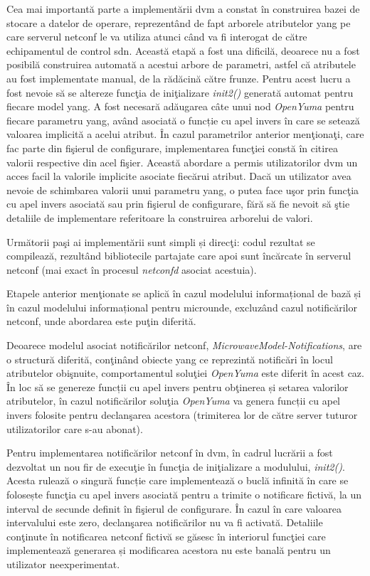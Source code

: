 Cea mai importantă parte a implementării \gls{dvm} a constat în construirea bazei de stocare a datelor de operare, reprezentând de fapt arborele atributelor \gls{yang} pe care serverul \gls{netconf} le va utiliza atunci când va fi interogat de către echipamentul de control \gls{sdn}. Această etapă a fost una dificilă, deoarece nu a fost posibilă construirea automată a acestui arbore de parametri, astfel că atributele au fost implementate manual, de la rădăcină către frunze. Pentru acest lucru a fost nevoie să se altereze funcţia de iniţializare \textit{init2()} generată automat pentru fiecare model \gls{yang}. A fost necesară adăugarea câte unui nod \textit{OpenYuma} pentru fiecare parametru \gls{yang}, având asociată o funcție cu apel invers în care se setează valoarea implicită a acelui atribut. În cazul parametrilor anterior menţionaţi, care fac parte din fişierul de configurare, implementarea funcţiei constă în citirea valorii respective din acel fişier. Această abordare a permis utilizatorilor \gls{dvm} un acces facil la valorile implicite asociate fiecărui atribut. Dacă un utilizator avea nevoie de schimbarea valorii unui parametru \gls{yang}, o putea face uşor prin funcţia cu apel invers asociată sau prin fişierul de configurare, fără să fie nevoit să ştie detaliile de implementare referitoare la construirea arborelui de valori.

Următorii paşi ai implementării sunt simpli și direcţi: codul rezultat se compilează, rezultând bibliotecile partajate care apoi sunt încărcate în serverul \gls{netconf} (mai exact în procesul \textit{netconfd} asociat acestuia).

Etapele anterior menţionate se aplică în cazul modelului informațional de bază și în cazul modelului informațional pentru microunde, excluzând cazul notificărilor \gls{netconf}, unde abordarea este puţin diferită.

Deoarece modelul asociat notificărilor \gls{netconf}, \textit{MicrowaveModel-Notifications}, are o structură diferită, conţinând obiecte \gls{yang} ce reprezintă notificări în locul atributelor obişnuite, comportamentul soluţiei \textit{OpenYuma} este diferit în acest caz. În loc să se genereze funcții cu apel invers pentru obţinerea și setarea valorilor atributelor, în cazul notificărilor soluţia \textit{OpenYuma} va genera funcții cu apel invers folosite pentru declanşarea acestora (trimiterea lor de către server tuturor utilizatorilor care s-au abonat).

Pentru implementarea notificărilor \gls{netconf} în \gls{dvm}, în cadrul lucrării a fost dezvoltat un nou fir de execuţie în funcţia de iniţializare a modulului, \textit{init2()}. Acesta rulează o singură funcție care implementează o buclă infinită în care se folosește funcţia cu apel invers asociată pentru a trimite o notificare fictivă, la un interval de secunde definit în fişierul de configurare. În cazul în care valoarea intervalului este zero, declanşarea notificărilor nu va fi activată. Detaliile conţinute în notificarea \gls{netconf} fictivă se găsesc în interiorul funcţiei care implementează generarea și modificarea acestora nu este banală pentru un utilizator neexperimentat.

